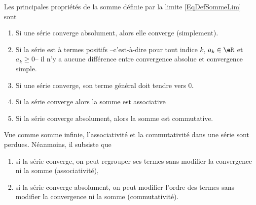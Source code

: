 \begin{proposition}\label{propnseries_propdebase}
Les principales propriétés de la somme définie par la limite \eqref{EqDefSommeLim} sont
  \begin{enumerate}
  \item Si une série converge absolument, alors elle converge
    (simplement).
  \item Si la série est à termes positifs --c'est-à-dire pour tout
    indice $k$, $a_k \in \eR$ et $a_k \geq 0$-- il n'y a aucune
    différence entre convergence absolue et convergence simple.
  \item\label{point3-seriepropdebase} Si une série converge, son terme général doit tendre vers $0$.
\item 
Si la série converge alors la somme est associative
\item
Si la série converge absolument, alors la somme est commutative.
  \end{enumerate}
\end{proposition}

\begin{remark}Vue comme somme infinie, l'associativité et la
  commutativité dans une série sont perdues. Néanmoins, il subsiste
  que
  \begin{enumerate}
  \item si la série converge, on peut regrouper ses termes sans
    modifier la convergence ni la somme (associativité),
  \item si la série converge absolument, on peut modifier l'ordre des
    termes sans modifier la convergence ni la somme (commutativité).
  \end{enumerate}
\end{remark}

